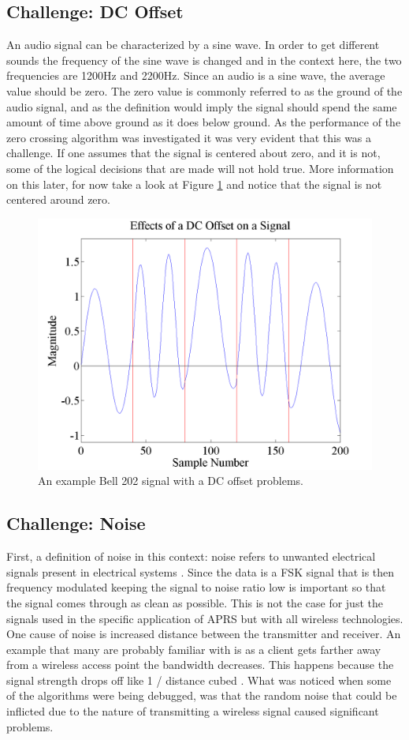 \subsection{Challenge: DC Offset}
An audio signal can be characterized by a sine wave. In order to get different sounds the frequency of the sine wave is changed and in the context here, the two frequencies are 1200Hz and 2200Hz. Since an audio is a sine wave, the average value should be zero. The zero value is commonly referred to as the ground of the audio signal, and as the definition would imply the signal should spend the same amount of time above ground as it does below ground. As the performance of the zero crossing algorithm was investigated it was very evident that this was a challenge. If one assumes that the signal is centered about zero, and it is not, some of the logical decisions that are made will not hold true. More information on this later, for now take a look at Figure \ref{DCOffsetExample} and notice that the signal is not centered around zero.
\begin{figure}
  \centering
	\includegraphics[width=0.75\linewidth]{images/EffectsofaDCOffsetonaSignal.png} 
	\caption{An example Bell 202 signal with a DC offset problems.}
   \label{DCOffsetExample}
\end{figure}

\subsection{Challenge: Noise}
First, a definition of noise in this context: noise refers to unwanted electrical signals present in electrical systems \cite{Sklar1988}. Since the data is a FSK signal that is then frequency modulated keeping the signal to noise ratio low is important so that the signal comes through as clean as possible. This is not the case for just the signals used in the specific application of APRS but with all wireless technologies. One cause of noise is increased distance between the transmitter and receiver. An example that many are probably familiar with is as a client gets farther away from a wireless access point the bandwidth decreases. This happens because the signal strength drops off like 1 / distance cubed \cite{4Gon}. What was noticed when some of the algorithms were being debugged, was that the random noise that could be inflicted due to the nature of transmitting a wireless signal caused significant problems.

